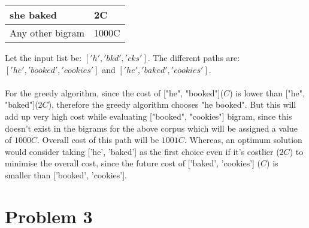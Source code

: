 \documentclass[12pt]{article}
\begin{document}
\begin{enumerate}[label=(\alph*)]
\begin{table}
\begin{tabular}{|ll|}
\hline
she baked        & 2C                    \\ 
\hline
Any other bigram & 1000C                 \\
\hline
\end{tabular}
\end{table}  
  Let the input list be: $['h', 'bkd', 'cks']$. The different paths are: $['he', 'booked', 'cookies']$ and $['he', 'baked', 'cookies']$. \\ \\
  For the greedy algorithm, since the cost of ["he", "booked"]($C$) is lower than ["he", "baked"]($2C$), therefore the greedy algorithm chooses "he booked". But this will add up very high cost while evaluating  ["booked", "cookies"] bigram, since this doesn't exist in the bigrams for the above corpus which will be assigned a value of $1000C$. Overall cost of this path will be $1001C$. Whereas, an optimum solution would consider taking ['he', 'baked'] as the first choice even if it's costlier ($2C$) to minimise the overall cost, since the future cost of ['baked', 'cookies'] ($C$) is smaller than ['booked', 'cookies'].

\end{enumerate}

\section*{Problem 3}
\end{document}

